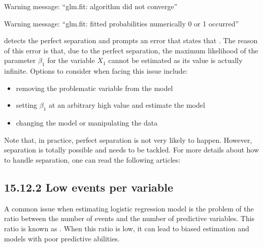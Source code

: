 \documentclass[letterpaper,10pt,english]{jupyterBook}
\begin{document}
\begin{sphinxVerbatim}[commandchars=\\\{\}]
Warning message:
“glm.fit: algorithm did not converge”
\end{sphinxVerbatim}

\begin{sphinxVerbatim}[commandchars=\\\{\}]
Warning message:
“glm.fit: fitted probabilities numerically 0 or 1 occurred”
\end{sphinxVerbatim}

\sphinxAtStartPar
{} detects the perfect separation and prompts an error that states that . The reason of this error is that, due to the perfect separation, the maximum likelihood of the parameter \(\beta_1\) for the variable \(X_1\) cannot be estimated as its value is actually infinite. Options to consider when facing this issue include:
\begin{itemize}
\item {} 
\sphinxAtStartPar
removing the problematic variable from the model

\item {} 
\sphinxAtStartPar
setting \(\beta_1\) at an arbitrary high value and estimate the model

\item {} 
\sphinxAtStartPar
changing the model or manipulating the data

\end{itemize}

\sphinxAtStartPar
Note that, in practice, perfect separation is not very likely to happen. However,  separation is totally possible and needs to be tackled. For more details about how to handle separation, one can read the following articles:
\begin{quote}

\sphinxAtStartPar
{}

\sphinxAtStartPar
{}
\end{quote}


\subsection{15.12.2 Low events per variable}
\label{\detokenize{15.k. Logistic Regression:low-events-per-variable}}
\sphinxAtStartPar
A common issue when estimating logistic regression model is the problem of the ratio between the number of events and the number of predictive variables. This ratio is known as . When this ratio is low, it can lead to biased estimation and models with poor predictive abilities.
\end{document}
